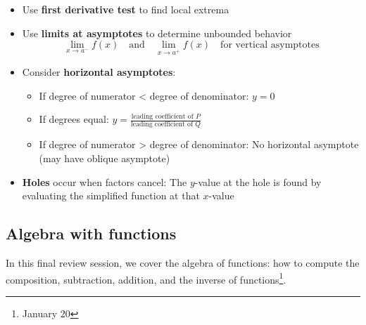 \documentclass[../main-notes.tex]{subfile}
\begin{document}
\begin{itemize}
    \item Use \textbf{first derivative test} to find local extrema
    \item Use \textbf{limits at asymptotes} to determine unbounded behavior
    \[
    \lim_{x \to a^-} f(x) \quad \text{and} \quad \lim_{x \to a^+} f(x) \quad \text{for vertical asymptotes}
    \]
    \item Consider \textbf{horizontal asymptotes}:
    \begin{itemize}
        \item If degree of numerator < degree of denominator: \( y = 0 \)
        \item If degrees equal: \( y = \frac{\text{leading coefficient of } P}{\text{leading coefficient of } Q} \)
        \item If degree of numerator > degree of denominator: No horizontal asymptote (may have oblique asymptote)
    \end{itemize}
    \item \textbf{Holes} occur when factors cancel: The \( y \)-value at the hole is found by evaluating the simplified function at that \( x \)-value
\end{itemize}


\newpage 

\subsection{Algebra with functions}

In this final review session, we cover the algebra of functions: how to compute the composition, subtraction, addition, and the inverse of functions\footnote{January 20}.
\end{document}
